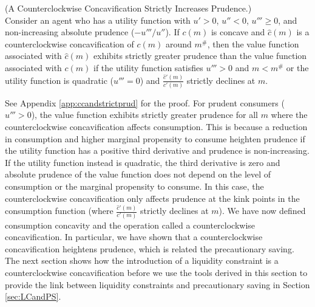   \begin{lemma} \label{lem:ccandstrictprud}(A Counterclockwise Concavification Strictly Increases Prudence.)\\
    Consider an agent who has a utility function with $u' > 0$, $u'' < 0$, $u''' \geq 0$, and non-increasing absolute prudence ($-u'''/u''$). If $c({m})$ is concave and $\hat{c}({m})$ is a counterclockwise concavification of $c({m})$ around ${m}^{\#}$, then the value function associated with $\hat{c}({m})$ exhibits strictly greater prudence than the value function associated with $c({m})$ if the utility function satisfies $u''' > 0$ and ${m} < {m}^{\#}$ or the utility function is quadratic ($u''' = 0$) and $\frac{\hat{c}'({m})}{c'({m})}$ strictly declines at ${m}$.
  \end{lemma}
  \noindent See Appendix \ref{app:ccandstrictprud} for the proof. For prudent consumers ($u''' > 0$), the value function exhibits strictly greater prudence for all $m$ where the counterclockwise concavification affects consumption. This is because a reduction in consumption and higher marginal propensity to consume heighten prudence if the utility function has a positive third derivative and prudence is non-increasing. If the utility function instead is quadratic, the third derivative is zero and absolute prudence of the value function does not depend on the level of consumption or the marginal propensity to consume. In this case, the counterclockwise concavification only affects prudence at the kink points in the consumption function (where $\frac{\hat{c}'({m})}{c'({m})}$ strictly declines at ${m}$).
  We have now defined consumption concavity and the operation called a counterclockwise concavification. In particular, we have shown that a counterclockwise concavification heightens prudence, which is related the precautionary saving. The next section shows how the introduction of a liquidity constraint is a counterclockwise concavification before we use the tools derived in this section to provide the link between liquidity constraints and precautionary saving in Section \ref{sec:LCandPS}.
